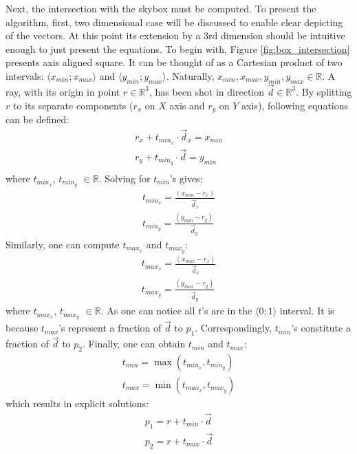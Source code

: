 \documentclass{report}
\begin{document}
Next, the intersection with the skybox must be computed. To present the algorithm, first, two dimensional case will be discussed to enable clear depicting of the vectors. At this point its extension by a 3rd dimension should be intuitive enough to just present the equations. To begin with, Figure \ref{fig:box_intersection} presents axis aligned square. It can be thought of as a Cartesian product of two intervals: $\langle x_{min} ; x_{max} \rangle$ and $\langle y_{min} ; y_{max} \rangle$. Naturally, $ x_{min}, x_{max}, y_{min}, y_{max} \in \mathbb{R}$. A ray, with its origin in point $r \in \mathbb{R}^{3}$, has been shot in direction $\vec{d} \in \mathbb{R}^{3}$. By splitting $r$ to its separate components ($r_x$ on $X$ axis and $r_y$ on $Y$ axis), following equations can be defined:
\begin{equation*}
\begin{split}
r_x + t_{min_{x}} \cdot \vec{d}_x = x_{min} \\
r_y + t_{min_{y}} \cdot \vec{d} = y_{min}  \\
\end{split}
\end{equation*}
where $t_{min_{x}}$, $t_{min_{y}} $ $\in \mathbb{R}$. Solving for  $t_{min}$'s gives: 
\begin{equation*}
\begin{split}
t_{min_{x}} = \frac{(x_{min} - r_x)}{\vec{d}_x}\\
t_{min_{y}} = \frac{(y_{min} - r_y)}{\vec{d}_y}
\end{split}
\end{equation*}
Similarly, one can compute $t_{max_{x}}$ and $t_{max_{y}}$:
\begin{equation*} 
\begin{split}
t_{max_{x}} = \frac{(x_{max} - r_x)}{\vec{d}_x}\\
t_{max_{y}} = \frac{(y_{max} - r_y)}{\vec{d}_y}
\end{split}
\end{equation*}
where $t_{max_{x}}$, $t_{max_{y}} $ $\in \mathbb{R}$. As one can notice all $t$'s are in the $\langle 0 ; 1 \rangle$ interval. It is because $t_{max}$'s represent a fraction of $\vec{d}$ to $p_1$. Correspondingly, $t_{min}$'s constitute a fraction of $\vec{d}$ to $p_2$. Finally, one can obtain $t_{min}$ and $t_{max}$:
\begin{equation*}
\begin{split}
t_{min} = \max (t_{min_x} , t_{min_y} )\\
t_{max} = \min (t_{max_x} , t_{max_y})
\end{split}
\end{equation*}
which results in explicit solutions:
\begin{equation}\label{eq:box_intersection}
\begin{split}
p_1 = r + t_{min} \cdot \vec{d} \\
p_2 = r + t_{max} \cdot \vec{d} 
\end{split}
\end{equation}
\end{document}

